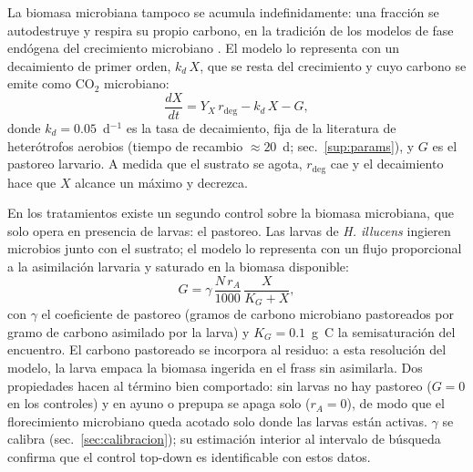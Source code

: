 La biomasa microbiana tampoco se acumula indefinidamente: una fracción se autodestruye y respira su propio carbono, en la tradición de los modelos de fase endógena del crecimiento microbiano \parencite{roels1980}. El modelo lo representa con un decaimiento de primer orden, $k_d\,X$, que se resta del crecimiento y cuyo carbono se emite como CO$_2$ microbiano:
\begin{equation}
  \frac{dX}{dt} = Y_X\,r_{\mathrm{deg}} - k_d\,X - G,
  \label{eq:balanceX}
\end{equation}
donde $k_d = 0.05$~d$^{-1}$ es la tasa de decaimiento, fija de la literatura de heterótrofos aerobios (tiempo de recambio $\approx 20$~d; sec.~\ref{sup:params}), y $G$ es el pastoreo larvario. A medida que el sustrato se agota, $r_{\mathrm{deg}}$ cae y el decaimiento hace que $X$ alcance un máximo y decrezca.

En los tratamientos existe un segundo control sobre la biomasa microbiana, que solo opera en presencia de larvas: el pastoreo. Las larvas de \textit{H. illucens} ingieren microbios junto con el sustrato; el modelo lo representa con un flujo proporcional a la asimilación larvaria y saturado en la biomasa disponible:
\begin{equation}
  G = \gamma\,\frac{N\,r_A}{1000}\,\frac{X}{K_G + X},
  \label{eq:pastoreo}
\end{equation}
con $\gamma$ el coeficiente de pastoreo (gramos de carbono microbiano pastoreados por gramo de carbono asimilado por la larva) y $K_G = 0.1$~g~C la semisaturación del encuentro. El carbono pastoreado se incorpora al residuo: a esta resolución del modelo, la larva empaca la biomasa ingerida en el frass sin asimilarla. Dos propiedades hacen al término bien comportado: sin larvas no hay pastoreo ($G = 0$ en los controles) y en ayuno o prepupa se apaga solo ($r_A = 0$), de modo que el florecimiento microbiano queda acotado solo donde las larvas están activas. $\gamma$ se calibra (sec.~\ref{sec:calibracion}); su estimación interior al intervalo de búsqueda confirma que el control top-down es identificable con estos datos.

